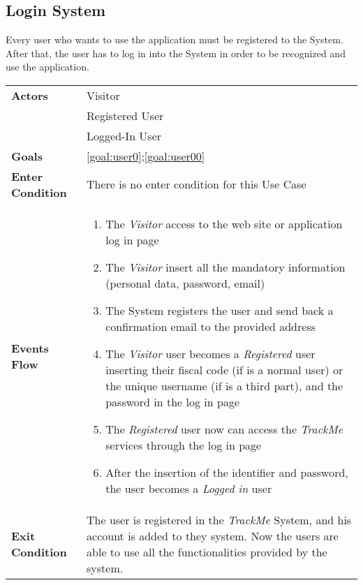   \subsection{Login System}
Every user who wants to use the application must be registered to the System.
After that, the user has to log in into the System in order to be recognized and use the application.

\begin{table}[H]
	\centering
    
    \begin{tabular}{|p{3.5cm}|p{10.3cm}|}
    
    \hline
    \textbf{\large{Actors}}  			& \tabitem Visitor 									\\
    				 					& \tabitem Registered User							\\
                     					& \tabitem Logged-In User 							\\
    \hline
    \textbf{\large{Goals}} 				& \ref{goal:user0};\ref{goal:user00}\\
    
    \hline
    \textbf{\large{Enter Condition}}	& There is no enter condition for this Use Case		\\
    
    \hline
    \textbf{\large{Events Flow}}		& \begin{enumerate}[leftmargin=0.5cm]
                                          	\item The \emph{Visitor}  access to the web site or application log in page
                                            \item The \emph{Visitor} insert all the mandatory information (personal data, password, email)
                                            \item The System registers the user and send back a confirmation email to the provided address
                                            \item The \emph{Visitor} user becomes a \emph{Registered} user inserting their fiscal code (if is a normal user) or the unique username (if is a third part), and the password in the log in page   
                                            \item The \emph{Registered} user now can access the \emph{TrackMe} services through the log in page
                                            
                                            \item After the insertion of the identifier and password, the user becomes a \emph{Logged in} user
                                          \end{enumerate}
    										\\
    \hline
    \textbf{\large{Exit Condition}} 	& The user is registered in the \emph{TrackMe} System, and his account is added to they system. Now the users are able to use all the functionalities provided by the system. \\
    

\end{tabular}
\end{table}
